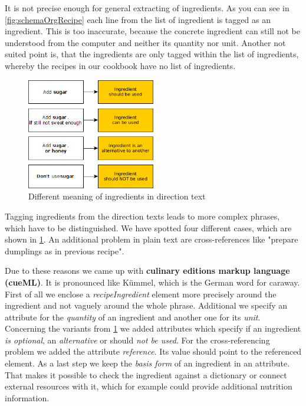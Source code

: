\documentclass[12pt, twoside]{report}
\begin{document}
It is not precise enough for general extracting of ingredients. As you can see in \cref{fig:schemaOrgRecipe} each line from the list of ingredient is tagged as an ingredient. This is too inaccurate, because the concrete ingredient can still not be understood from the computer and neither its quantity nor unit. Another not suited point is, that the ingredients are only tagged within the list of ingredients, whereby the recipes in our cookbook have no list of ingredients.

\begin{figure}
	\includegraphics[width=0.5\textwidth]{Images/ingredientsInText}
	\caption{Different meaning of ingredients in direction text}
	\label{fig:ingredientsInText}
\end{figure}

Tagging ingredients from the direction texts leads to more complex phrases, which have to be distinguished. We have spotted four different cases, which are shown in \cref{fig:ingredientsInText}. An additional problem in plain text are cross-references like "prepare dumplings as in previous recipe".

Due to these reasons we came up with \textbf{culinary editions markup language (cueML)}. It is pronounced like Kümmel, which is the German word for caraway. First of all we enclose a \textit{recipeIngredient} element more precisely around the ingredient and not vaguely around the whole phrase. Additional we specify an attribute for the \textit{quantity} of an ingredient and another one for its \textit{unit}. Concerning the variants from \cref{fig:ingredientsInText} we added attributes which specify if an ingredient \textit{is optional}, an \textit{alternative}  or should \textit{not be used}. For the cross-referencing problem we added the attribute \textit{reference}. Its value should point to the referenced element. As a last step we keep the \textit{basis form} of an ingredient in an attribute. That makes it possible to check the ingredient against a dictionary or connect external resources with it, which for example could provide additional nutrition information.
\end{document}
